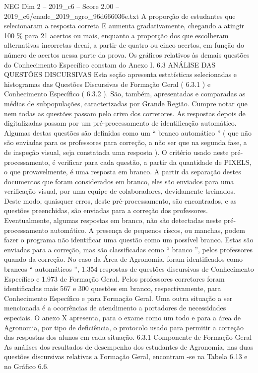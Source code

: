 \begin{textsample}{NEG Dim 2 – 2019\_c6 – Score 2.00 – 2019\_c6/enade\_2019\_agro\_96d666036e.txt}
A proporção de estudantes que selecionaram a resposta correta E aumenta gradativamente, chegando a atingir 100 \% para 21 acertos ou mais, enquanto a proporção dos que escolheram alternativas incorretas decai, a partir de quatro ou cinco acertos, em função do número de acertos nessa parte da prova.
Os gráficos relativos às demais questões do Conhecimento Específico constam do Anexo I. 6.3 ANÁLISE DAS QUESTÕES DISCURSIVAS Esta seção apresenta estatísticas selecionadas e histogramas das Questões Discursivas de Formação Geral ( 6.3.1 ) e Conhecimento Específico ( 6.3.2 ).
São, também, apresentadas e comparadas as médias de subpopulações, caracterizadas por Grande Região.
Cumpre notar que nem todas as questões passam pelo crivo dos corretores.
As respostas depois de digitalizadas passam por um pré-processamento de identificação automático.
Algumas destas questões são definidas como um “ branco automático ” ( que não são enviadas para os professores para correção, a não ser que na segunda fase, a de inspeção visual, seja constatada uma resposta ).
O critério usado neste pré-processamento, é verificar para cada questão, a partir da quantidade de PIXELS, o que provavelmente, é uma resposta em branco.
A partir da separação destes documentos que foram considerados em branco, eles são enviados para uma verificação visual, por uma equipe de colaboradores, devidamente treinados.
Deste modo, quaisquer erros, deste pré-processamento, são encontrados, e as questões preenchidas, são enviadas para a correção dos professores.
Eventualmente, algumas respostas em branco, não são detectadas neste pré-processamento automático.
A presença de pequenos riscos, ou manchas, podem fazer o programa não identificar uma questão como um possível branco.
Estas são enviadas para a correção, mas são classificadas como “ branco ”, pelos professores quando da correção.
No caso da Área de Agronomia, foram identificados como brancos “ automáticos ”, 1.354 respostas de questões discursivas de Conhecimento Específico e 1.973 de Formação Geral.
Pelos professores corretores foram identificadas mais 567 e 300 questões em branco, respectivamente, para Conhecimento Específico e para Formação Geral.
Uma outra situação a ser mencionada é a ocorrências de atendimento a portadores de necessidades especiais.
O anexo X apresenta, para o exame como um todo e para a área de Agronomia, por tipo de deficiência, o protocolo usado para permitir a correção das respostas dos alunos em cada situação. 6.3.1 Componente de Formação Geral As análises dos resultados de desempenho dos estudantes de Agronomia, nas duas questões discursivas relativas a Formação Geral, encontram -se na Tabela 6.13 e no Gráfico 6.6.

\end{textsample}
